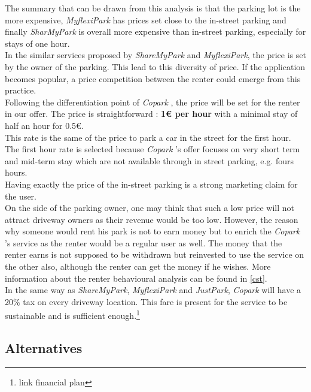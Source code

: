 \documentclass[12pt,a4paper,oneside]{book}
\newcommand{\bp}{\textit{Copark }}
\begin{document}
The summary that can be drawn from this analysis is that the parking lot is the more expensive, \textit{MyflexiPark} has prices set close to the in-street parking and finally \textit{SharMyPark} is overall more expensive than in-street parking, especially for stays of one hour.\\

In the similar services proposed by \textit{ShareMyPark} and \textit{MyflexiPark}, the price is set by the owner of the parking. This lead to this diversity of price. If the application becomes popular, a price competition between the renter could emerge from this practice.\\

Following the differentiation point of \bp, the price will be set for the renter in our offer. The price is straightforward : \textbf{1\euro{} per hour} with a minimal stay of half an hour for 0.5\euro{}.\\
This rate is the same of the price to park a car in the street for the first hour. The first hour rate is selected because \bp's offer focuses on very short term and mid-term stay which are not available through in street parking, e.g. fours hours.\\
Having exactly the price of the in-street parking is a strong marketing claim for the user.\\

On the side of the parking owner, one may think that such a low price will not attract driveway owners as their revenue would be too low. However, the reason why someone would rent his park is not to earn money but to enrich the \bp's service as the renter would be a regular user as well. The money that the renter earns is not supposed to be withdrawn but reinvested to use the service on the other also, although the renter can get the money if he wishes. More information about the renter behavioural analysis can be found in \autoref{cst}.\\

In the same way as \textit{ShareMyPark}, \textit{MyflexiPark} and \textit{JustPark}, \bp will have a 20\% tax on every driveway location. This fare is present for the service to be sustainable and is sufficient enough.\footnote{link financial plan}\\

\subsection{Alternatives}
\end{document}
